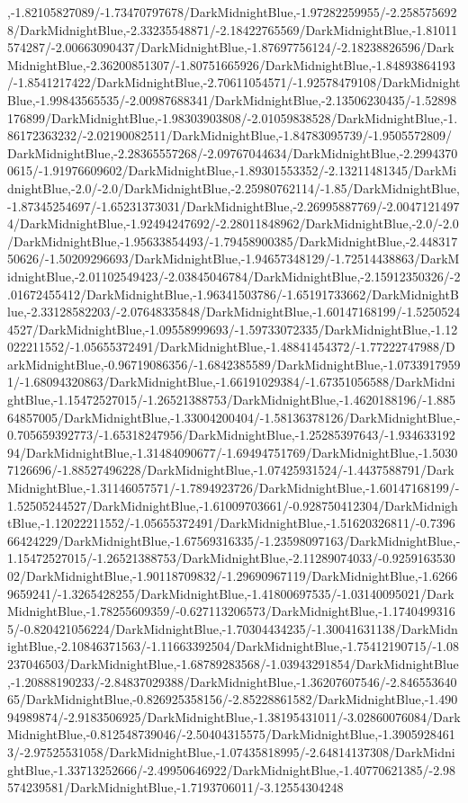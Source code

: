 {\begin{tikzternal}
,-1.82105827089/-1.73470797678/DarkMidnightBlue,-1.97282259955/-2.2585756928/DarkMidnightBlue,-2.33235548871/-2.18422765569/DarkMidnightBlue,-1.81011574287/-2.00663090437/DarkMidnightBlue,-1.87697756124/-2.18238826596/DarkMidnightBlue,-2.36200851307/-1.80751665926/DarkMidnightBlue,-1.84893864193/-1.8541217422/DarkMidnightBlue,-2.70611054571/-1.92578479108/DarkMidnightBlue,-1.99843565535/-2.00987688341/DarkMidnightBlue,-2.13506230435/-1.52898176899/DarkMidnightBlue,-1.98303903808/-2.01059838528/DarkMidnightBlue,-1.86172363232/-2.02190082511/DarkMidnightBlue,-1.84783095739/-1.9505572809/DarkMidnightBlue,-2.28365557268/-2.09767044634/DarkMidnightBlue,-2.29943700615/-1.91976609602/DarkMidnightBlue,-1.89301553352/-2.13211481345/DarkMidnightBlue,-2.0/-2.0/DarkMidnightBlue,-2.25980762114/-1.85/DarkMidnightBlue,-1.87345254697/-1.65231373031/DarkMidnightBlue,-2.26995887769/-2.00471214974/DarkMidnightBlue,-1.92494247692/-2.28011848962/DarkMidnightBlue,-2.0/-2.0/DarkMidnightBlue,-1.95633854493/-1.79458900385/DarkMidnightBlue,-2.44831750626/-1.50209296693/DarkMidnightBlue,-1.94657348129/-1.72514438863/DarkMidnightBlue,-2.01102549423/-2.03845046784/DarkMidnightBlue,-2.15912350326/-2.01672455412/DarkMidnightBlue,-1.96341503786/-1.65191733662/DarkMidnightBlue,-2.33128582203/-2.07648335848/DarkMidnightBlue,-1.60147168199/-1.52505244527/DarkMidnightBlue,-1.09558999693/-1.59733072335/DarkMidnightBlue,-1.12022211552/-1.05655372491/DarkMidnightBlue,-1.48841454372/-1.77222747988/DarkMidnightBlue,-0.96719086356/-1.6842385589/DarkMidnightBlue,-1.07339179591/-1.68094320863/DarkMidnightBlue,-1.66191029384/-1.67351056588/DarkMidnightBlue,-1.15472527015/-1.26521388753/DarkMidnightBlue,-1.4620188196/-1.88564857005/DarkMidnightBlue,-1.33004200404/-1.58136378126/DarkMidnightBlue,-0.705659392773/-1.65318247956/DarkMidnightBlue,-1.25285397643/-1.93463319294/DarkMidnightBlue,-1.31484090677/-1.69494751769/DarkMidnightBlue,-1.50307126696/-1.88527496228/DarkMidnightBlue,-1.07425931524/-1.4437588791/DarkMidnightBlue,-1.31146057571/-1.7894923726/DarkMidnightBlue,-1.60147168199/-1.52505244527/DarkMidnightBlue,-1.61009703661/-0.928750412304/DarkMidnightBlue,-1.12022211552/-1.05655372491/DarkMidnightBlue,-1.51620326811/-0.739666424229/DarkMidnightBlue,-1.67569316335/-1.23598097163/DarkMidnightBlue,-1.15472527015/-1.26521388753/DarkMidnightBlue,-2.11289074033/-0.925916353002/DarkMidnightBlue,-1.90118709832/-1.29690967119/DarkMidnightBlue,-1.62669659241/-1.3265428255/DarkMidnightBlue,-1.41800697535/-1.03140095021/DarkMidnightBlue,-1.78255609359/-0.627113206573/DarkMidnightBlue,-1.17404993165/-0.820421056224/DarkMidnightBlue,-1.70304434235/-1.30041631138/DarkMidnightBlue,-2.10846371563/-1.11663392504/DarkMidnightBlue,-1.75412190715/-1.08237046503/DarkMidnightBlue,-1.68789283568/-1.03943291854/DarkMidnightBlue,-1.20888190233/-2.84837029388/DarkMidnightBlue,-1.36207607546/-2.84655364065/DarkMidnightBlue,-0.826925358156/-2.85228861582/DarkMidnightBlue,-1.49094989874/-2.9183506925/DarkMidnightBlue,-1.38195431011/-3.02860076084/DarkMidnightBlue,-0.812548739046/-2.50404315575/DarkMidnightBlue,-1.39059284613/-2.97525531058/DarkMidnightBlue,-1.07435818995/-2.64814137308/DarkMidnightBlue,-1.33713252666/-2.49950646922/DarkMidnightBlue,-1.40770621385/-2.98574239581/DarkMidnightBlue,-1.7193706011/-3.12554304248
\end{tikzternal}}
